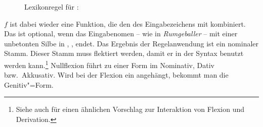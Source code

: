 \begin{figure}
\eas
\label{lr-gee-nom}%
Lexikonregel für \geenen:\\
\zs
\vspace{-\baselineskip}
\end{figure}

\noindent
$f$ ist dabei wieder eine Funktion, die den \phonw des Eingabezeichens
mit \gee kombiniert. 
Das  ist optional, wenn das Eingabenomen -- wie \zb in \emph{Rumgeballer} --
mit einer unbetonten Silbe in , ,  endet.
Das Ergebnis der Regelanwendung ist ein nominaler Stamm. Dieser Stamm
muss flektiert werden, damit er in der Syntax benutzt werden kann.\footnote{
        Siehe auch \citet[]{Koenig99a} für einen
        ähnlichen Vorschlag zur Interaktion von Flexion und Derivation.%
}
Nullflexion führt zu einer Form
im Nominativ, Dativ bzw.\ Akkusativ. Wird bei der Flexion ein  angehängt,
bekommt man die Genitiv"=Form.

